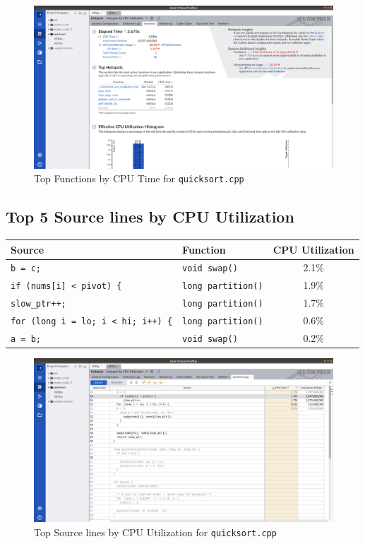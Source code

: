 \documentclass[11pt, swedish, openany]{book}
\begin{document}
\begin{figure}[H]
    \centering
    \includegraphics[scale=0.25]{vtune/quicksort/hs.png}
    \caption{Top Functions by CPU Time for \texttt{quicksort.cpp}}
\end{figure}

\newpage
\subsection*{Top 5 Source lines by CPU Utilization}
\begin{table}[H]
    \begin{tabular}{||l|l||c||}
        \hline
        Source                                     & Function                  & CPU Utilization \\
        \hline
        \texttt{b = c;}                            & \texttt{void swap()}      & 2.1\%           \\
        \texttt{if (nums[i] < pivot) \{}           & \texttt{long partition()} & 1.9\%           \\
        \texttt{slow\_ptr++;}                      & \texttt{long partition()} & 1.7\%           \\
        \texttt{for (long i = lo; i < hi; i++) \{} & \texttt{long partition()} & 0.6\%           \\
        \texttt{a = b;}                            & \texttt{void swap()}      & 0.2\%           \\
        \hline
    \end{tabular}
\end{table}

\begin{figure}[H]
    \centering
    \includegraphics[scale=0.25]{vtune/quicksort/sc.png}
    \caption{Top Source lines by CPU Utilization for \texttt{quicksort.cpp}}
\end{figure}
\end{document}
